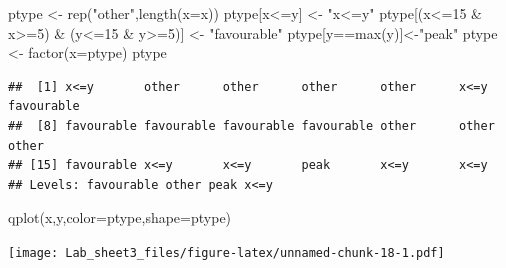\documentclass[
]{article}
\newenvironment{Shaded}{\begin{snugshade}}{\end{snugshade}}
\newcommand{\AttributeTok}[1]{\textcolor[rgb]{0.77,0.63,0.00}{#1}}
\newcommand{\DecValTok}[1]{\textcolor[rgb]{0.00,0.00,0.81}{#1}}
\newcommand{\FunctionTok}[1]{\textcolor[rgb]{0.00,0.00,0.00}{#1}}
\newcommand{\NormalTok}[1]{#1}
\newcommand{\OtherTok}[1]{\textcolor[rgb]{0.56,0.35,0.01}{#1}}
\newcommand{\SpecialCharTok}[1]{\textcolor[rgb]{0.00,0.00,0.00}{#1}}
\newcommand{\StringTok}[1]{\textcolor[rgb]{0.31,0.60,0.02}{#1}}
\theoremstyle{remark}
\begin{document}
\begin{Shaded}
\begin{Highlighting}[]
\NormalTok{ptype }\OtherTok{\textless{}{-}} \FunctionTok{rep}\NormalTok{(}\StringTok{"other"}\NormalTok{,}\FunctionTok{length}\NormalTok{(}\AttributeTok{x=}\NormalTok{x))}
\NormalTok{ptype[x}\SpecialCharTok{\textless{}=}\NormalTok{y] }\OtherTok{\textless{}{-}} \StringTok{"x\textless{}=y"}
\NormalTok{ptype[(x}\SpecialCharTok{\textless{}=}\DecValTok{15} \SpecialCharTok{\&}\NormalTok{ x}\SpecialCharTok{\textgreater{}=}\DecValTok{5}\NormalTok{) }\SpecialCharTok{\&}\NormalTok{ (y}\SpecialCharTok{\textless{}=}\DecValTok{15} \SpecialCharTok{\&}\NormalTok{ y}\SpecialCharTok{\textgreater{}=}\DecValTok{5}\NormalTok{)] }\OtherTok{\textless{}{-}} \StringTok{"favourable"}
\NormalTok{ptype[y}\SpecialCharTok{==}\FunctionTok{max}\NormalTok{(y)]}\OtherTok{\textless{}{-}}\StringTok{"peak"}
\NormalTok{ptype }\OtherTok{\textless{}{-}} \FunctionTok{factor}\NormalTok{(}\AttributeTok{x=}\NormalTok{ptype)}
\NormalTok{ptype}
\end{Highlighting}
\end{Shaded}

\begin{verbatim}
##  [1] x<=y       other      other      other      other      x<=y       favourable
##  [8] favourable favourable favourable favourable other      other      other     
## [15] favourable x<=y       x<=y       peak       x<=y       x<=y      
## Levels: favourable other peak x<=y
\end{verbatim}

\begin{Shaded}
\begin{Highlighting}[]
\FunctionTok{qplot}\NormalTok{(x,y,}\AttributeTok{color=}\NormalTok{ptype,}\AttributeTok{shape=}\NormalTok{ptype)}
\end{Highlighting}
\end{Shaded}

\texttt{[image: Lab\_sheet3\_files/figure-latex/unnamed-chunk-18-1.pdf]}
\end{document}

